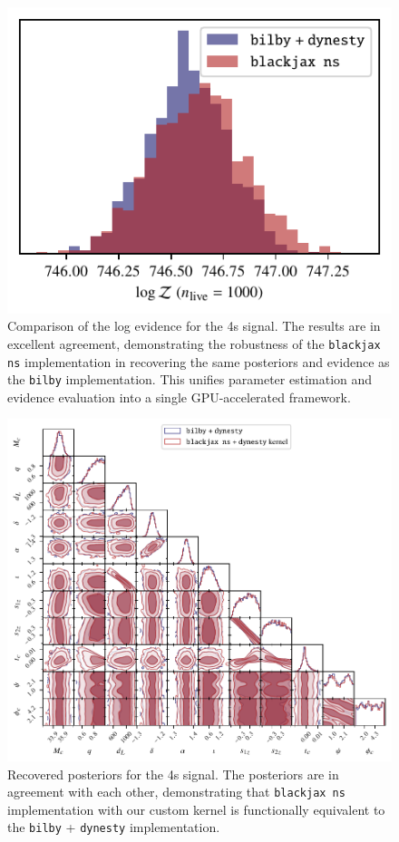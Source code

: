\documentclass[fleqn,usenatbib]{mnras}
\begin{document}
\begin{figure}
    \centering
    \includegraphics{figures/4s_logZ_comparison.pdf}
    \caption{Comparison of the log evidence for the 4s signal. The results are in excellent agreement, demonstrating the
    robustness of the \texttt{blackjax ns} implementation in recovering the same posteriors and evidence as the \texttt{bilby} implementation.
    This unifies parameter estimation and evidence evaluation into a single GPU-accelerated framework.}
    \label{fig:4s_logZ_comparison}
\end{figure}

\begin{figure}
    \centering
    \includegraphics{figures/bilby_blackjax_comparison_4s.pdf}
    \caption{Recovered posteriors for the 4s signal. The posteriors are in agreement with each other, demonstrating that
    \texttt{blackjax ns} implementation with our custom kernel is functionally equivalent to the \texttt{bilby} + \texttt{dynesty} implementation.}
    \label{fig:4s_posteriors}
\end{figure}
\end{document}
